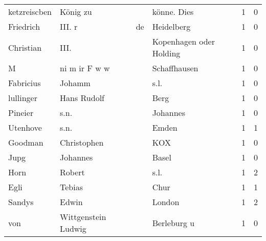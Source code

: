 \begin{tabular}{llllrr}
             ketzreiscben &                           König zu &             &                                 könne. Dies &          1 &         0 \\
                Friedrich &                             III. r &          de &                                  Heidelberg &          1 &         0 \\
                Christian &                               III. &             &                     Kopenhagen oder Holding &          1 &         0 \\
                        M &                      ni m ir F w w &             &                                Schaffhausen &          1 &         0 \\
                Fabricius &                             Johamm &             &                                        s.l. &          1 &         0 \\
                lullinger &                        Hans Rudolf &             &                                        Berg &          1 &         0 \\
                  Pineier &                               s.n. &             &                                    Johannes &          1 &         0 \\
                 Utenhove &                               s.n. &             &                                       Emden &          1 &         1 \\
                  Goodman &                        Christophen &             &                                         KOX &          1 &         0 \\
                     Jupg &                           Johannes &             &                                       Basel &          1 &         0 \\
                     Horn &                             Robert &             &                                        s.l. &          1 &         2 \\
                     Egli &                             Tebias &             &                                        Chur &          1 &         1 \\
                   Sandys &                              Edwin &             &                                      London &          1 &         2 \\
                      von &                Wittgenstein Ludwig &             &                                 Berleburg u &          1 &         0 \\

\end{tabular}
